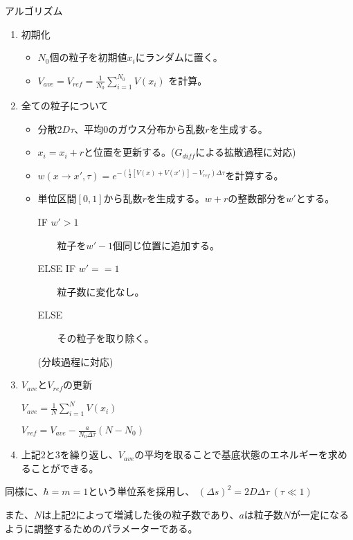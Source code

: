 \documentclass[dvipdfmx]{beamer}
\begin{document}
    \begin{frame}{アルゴリズム}
        \begin{enumerate}
            \item 初期化
            \begin{itemize}
                \item $N_0$個の粒子を初期値$x_i$にランダムに置く。
                \item $V_{ave} = V_{ref} = \frac{1}{N_0} \sum_{i=1}^{N_0}V(x_i)$ を計算。
            \end{itemize}

            \item 全ての粒子について
            \begin{itemize}
                \item 分散$2D\tau$、平均$0$のガウス分布から乱数$r$を生成する。
                \item $x_i = x_i + r$と位置を更新する。($G_{diff}$による拡散過程に対応)
                \item $w(x\to x',\tau) = e^{-(\frac{1}{2}[V(x)+V(x')]-V_{ref})\Delta\tau}$を計算する。
                \item 単位区間$[0,1]$から乱数$r$を生成する。$w+r$の整数部分を$w'$とする。

                IF $w' > 1$

                ~~~~粒子を$w'-1$個同じ位置に追加する。

                ELSE IF $w' == 1$

                ~~~~粒子数に変化なし。

                ELSE

                ~~~~その粒子を取り除く。

                (分岐過程に対応)
            \end{itemize}

        \end{enumerate}

    \end{frame}

    \begin{frame}
        \begin{enumerate}
            \setcounter{enumi}{2}
            \item $V_{ave}$と$V_{ref}$の更新

            $V_{ave} = \frac{1}{N}\sum_{i=1}^{N}V(x_i)$

            $V_{ref} = V_{ave} - \frac{a}{N_0\Delta\tau}(N-N_0)$

            \item 上記$2$と$3$を繰り返し、$V_{ave}$の平均を取ることで基底状態のエネルギーを求めることができる。
        \end{enumerate}
        同様に、$\hbar = m = 1$という単位系を採用し、
        $(\Delta s)^2 = 2D\Delta \tau~(\tau \ll 1)$

        また、$N$は上記$2$によって増減した後の粒子数であり、$a$は粒子数$N$が一定になるように調整するためのパラメーターである。
    \end{frame}

\end{document}
